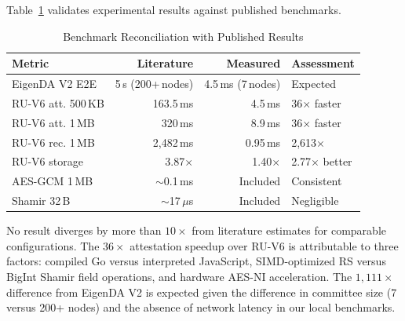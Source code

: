 Table~\ref{tab:reconciliation} validates experimental results against
published benchmarks.

\begin{table}[t]
\centering
\caption{Benchmark Reconciliation with Published Results}
\label{tab:reconciliation}
\begin{tabular}{@{}p{2.5cm}rrp{1.8cm}@{}}
\toprule
\textbf{Metric} & \textbf{Literature} & \textbf{Measured} & \textbf{Assessment} \\
\midrule
EigenDA V2 E2E & 5\,s (200+\,nodes) & 4.5\,ms (7\,nodes) & Expected \\
RU-V6 att. 500\,KB & 163.5\,ms & 4.5\,ms & 36$\times$ faster \\
RU-V6 att. 1\,MB & 320\,ms & 8.9\,ms & 36$\times$ faster \\
RU-V6 rec. 1\,MB & 2{,}482\,ms & 0.95\,ms & 2{,}613$\times$ \\
RU-V6 storage & 3.87$\times$ & 1.40$\times$ & 2.77$\times$ better \\
AES-GCM 1\,MB & $\sim$0.1\,ms & Included & Consistent \\
Shamir 32\,B & $\sim$17\,$\mu$s & Included & Negligible \\
\bottomrule
\end{tabular}
\end{table}

No result diverges by more than $10\times$ from literature estimates for
comparable configurations. The $36\times$ attestation speedup over RU-V6
is attributable to three factors: compiled Go versus interpreted
JavaScript, SIMD-optimized RS versus BigInt Shamir field operations,
and hardware AES-NI acceleration. The $1{,}111\times$ difference from
EigenDA V2 is expected given the difference in committee size (7 versus
200+ nodes) and the absence of network latency in our local benchmarks.
